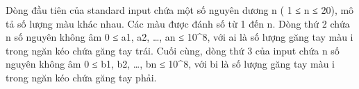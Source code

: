 Dòng đầu tiên của standard input chứa một số nguyên dương n ( 1 ≤ n ≤ 20), mô tả số lượng màu khác nhau. Các màu được đánh số từ 1 đến n. Dòng thứ 2 chứa n số nguyên không âm 0 ≤ a1, a2, …, an ≤ 10^8, với ai là số lượng găng tay màu i trong ngăn kéo chứa găng tay trái. Cuối cùng, dòng thứ 3 của input chứa n số nguyên không âm 0 ≤ b1, b2, …, bn ≤ 10^8, với bi là số lượng găng tay màu i trong ngăn kéo chứa găng tay phải.